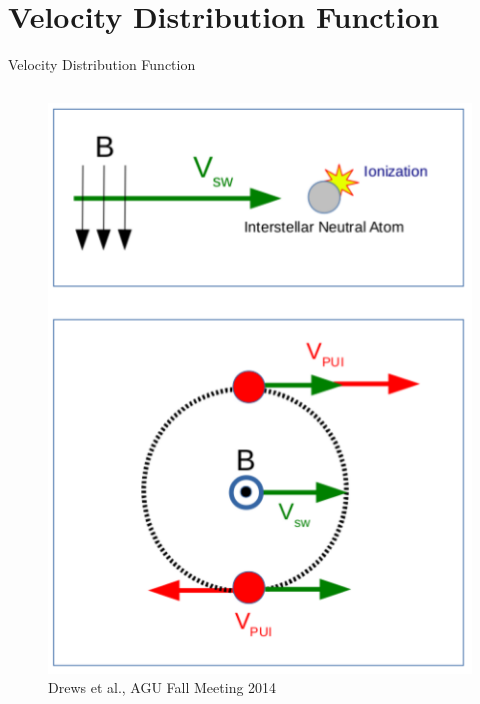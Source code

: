 \documentclass{beamer}
\begin{document}
\section{Velocity Distribution Function}
\begin{frame}{Velocity Distribution Function}
\begin{columns}
	\column{4.5cm}
		\flushright
		\begin{figure}
		\includegraphics[scale=0.25]{pictures/pu_process_1_2.png}
		\caption{\tiny{Drews et al., AGU Fall Meeting 2014}}
		\end{figure}
	\column{1.5cm}

\end{columns}
\end{frame}
\end{document}
